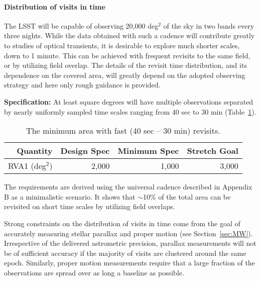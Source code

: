 \paragraph{Distribution of visits in time\\}

The LSST will be capable of observing 20,000 deg$^2$ of the sky in two
bands every three nights. While the data obtained with such a cadence will
contribute greatly to studies of optical transients, it is desirable to
explore much shorter scales, down to 1 minute. This can be achieved with
frequent revisits to the same field, or by utilizing field overlap.  The
details of the revisit time distribution, and its dependence on the covered
area, will greatly depend on the adopted observing strategy and here only
rough guidance is provided.

{\bf Specification:} At least
square degrees will have multiple observations separated by nearly uniformly
sampled time scales ranging from 40 sec to 30 min (Table~\ref{TfastArea}).

\begin{table}[h]
\begin{tabular}{|r|r|r|r|}
\hline
Quantity            & Design Spec & Minimum Spec & Stretch Goal     \\
\hline
  RVA1  (deg$^2$)   &  2,000      &  1,000       &     3,000        \\
\hline
\end{tabular}
\caption{The minimum area with fast (40 sec -- 30 min) revisits.}
\label{TfastArea}
\end{table}

The requirements are derived using the universal cadence described in
Appendix B as a minimalistic scenario. It shows that $\sim$10\% of the
total area can be revisited on short time scales by utilizing field
overlaps.

Strong constraints on the distribution of visits in time come from the goal
of accurately measuring stellar parallax and proper motion (see Section~\ref{sec:MW}).
Irrespective of the delivered astrometric precision, parallax measurements will
not be of sufficient accuracy if the majority of visits are clustered around
the same epoch. Similarly, proper motion measurements require that a large
fraction of the observations are spread over as long a baseline as possible.

